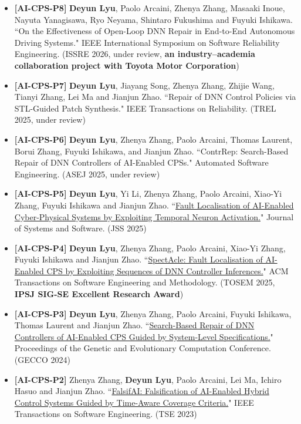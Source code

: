 \documentclass[11pt,a4paper]{moderncv}        %
\newcommand{\highlight}[1]{\textcolor{deepPurple}{\textbf{#1}}}
\begin{document}
\begin{itemize}
    \item \hypertarget{pub:AI-CPS-P8}{}\textbf{[AI-CPS-P8]} \textbf{Deyun Lyu}, Paolo Arcaini, Zhenya Zhang, Masaaki Inoue, Nayuta Yanagisawa, Ryo Neyama, Shintaro Fukushima and Fuyuki Ishikawa. ``On the Effectiveness of Open-Loop DNN Repair in End-to-End Autonomous Driving Systems." IEEE International Symposium on Software Reliability Engineering. (ISSRE 2026, under review, \highlight{an industry–academia collaboration project with Toyota Motor Corporation})
    \item \hypertarget{pub:AI-CPS-P7}{}\textbf{[AI-CPS-P7]} \textbf{Deyun Lyu}, Jiayang Song, Zhenya Zhang, Zhijie Wang, Tianyi Zhang, Lei Ma and Jianjun Zhao. ``Repair of DNN Control Policies via STL-Guided Patch Synthesis." IEEE Transactions on Reliability. (TREL 2025, under review)
    \item \hypertarget{pub:AI-CPS-P6}{}\textbf{[AI-CPS-P6]} \textbf{Deyun Lyu}, Zhenya Zhang, Paolo Arcaini, Thomas Laurent, Borui Zhang, Fuyuki Ishikawa, and Jianjun Zhao. ``ContrRep: Search-Based Repair of DNN Controllers of AI-Enabled CPSs." Automated Software Engineering. (ASEJ 2025, under review)
    \item \hypertarget{pub:AI-CPS-P5}{}\textbf{[AI-CPS-P5]} \textbf{Deyun Lyu}, Yi Li, Zhenya Zhang, Paolo Arcaini, Xiao-Yi Zhang, Fuyuki Ishikawa and Jianjun Zhao. ``\href{https://www.sciencedirect.com/science/article/abs/pii/S0164121225001438}{Fault Localisation of AI-Enabled Cyber-Physical Systems by Exploiting Temporal Neuron Activation.}" Journal of Systems and Software. (JSS 2025) 
    \item \hypertarget{pub:AI-CPS-P4}{}\textbf{[AI-CPS-P4]} \textbf{Deyun Lyu}, Zhenya Zhang, Paolo Arcaini, Xiao-Yi Zhang, Fuyuki Ishikawa and Jianjun Zhao. ``\href{https://dl.acm.org/doi/10.1145/3705307}{SpectAcle: Fault Localisation of AI-Enabled CPS by Exploiting Sequences of DNN Controller Inferences.}" ACM Transactions on Software Engineering and Methodology. (TOSEM 2025, \highlight{IPSJ SIG-SE Excellent Research Award})
    \item \hypertarget{pub:AI-CPS-P3}{}\textbf{[AI-CPS-P3]} \textbf{Deyun Lyu}, Zhenya Zhang, Paolo Arcaini, Fuyuki Ishikawa, Thomas Laurent and Jianjun Zhao. ``\href{https://dl.acm.org/doi/10.1145/3638529.3654078}{Search-Based Repair of DNN Controllers of AI-Enabled CPS Guided by System-Level Specifications.}"  Proceedings of the Genetic and Evolutionary Computation Conference. (GECCO 2024)
    \item \hypertarget{pub:AI-CPS-P2}{}\textbf{[AI-CPS-P2]} Zhenya Zhang, \textbf{Deyun Lyu}, Paolo Arcaini, Lei Ma, Ichiro Hasuo and Jianjun Zhao. ``\href{https://ieeexplore.ieee.org/document/9844247}{FalsifAI: Falsification of AI-Enabled Hybrid Control Systems Guided by Time-Aware Coverage Criteria.}" IEEE Transactions on Software Engineering. (TSE 2023)

\end{itemize}
\end{document}
